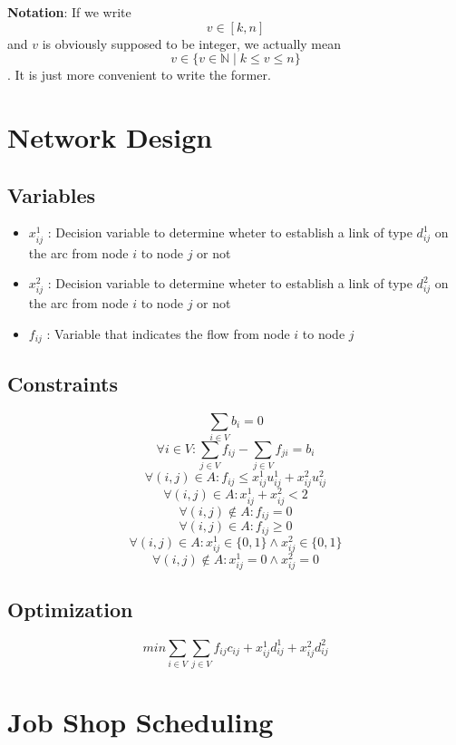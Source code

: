 \documentclass{article}
\begin{document}
\sloppy


\textbf{Notation}: If we write \[ v \in [k,n] \] and $v$ is obviously supposed to be integer, we actually mean \[v \in \{v \in \mathbb{N} \mid k \leq v \leq n\}\]. It is just more convenient to write the former.

\section{Network Design}

\subsection{Variables}
\begin{itemize}
	\item $x^1_{ij}$ : Decision variable to determine wheter to establish a link of type $d^1_{ij}$ on the arc from node $i$ to node $j$ or not
	\item $x^2_{ij}$ : Decision variable to determine wheter to establish a link of type $d^2_{ij}$ on the arc from node $i$ to node $j$ or not
	\item $f_{ij}$ : Variable that indicates the flow from node $i$ to node $j$
\end{itemize}

\subsection{Constraints}
\[ \sum_{i\in V}b_i = 0 \]
\[ \forall i \in V : \sum_{j\in V}f_{ij} - \sum_{j\in V}f_{ji} = b_i  \]
\[ \forall (i,j) \in A : f_{ij} \leq x^1_{ij}u^1_{ij} + x^2_{ij}u^2_{ij}  \]
\[ \forall (i,j) \in A : x^1_{ij} + x^2_{ij} < 2 \]
\[ \forall (i,j) \notin A : f_{ij} = 0  \]
\[ \forall (i,j) \in A : f_{ij} \geq 0 \]
\[ \forall (i,j) \in A : x^1_{ij} \in \{0,1\} \wedge x^2_{ij} \in \{0,1\} \]
\[ \forall (i,j) \notin A : x^1_{ij} = 0 \wedge x^2_{ij} = 0 \]

\subsection{Optimization}

\[ min \sum_{i\in V}\sum_{j\in V}f_{ij}c_{ij} + x^1_{ij}d^1_{ij} + x^2_{ij}d^2_{ij} \]

\clearpage

\section{Job Shop Scheduling}
\end{document}
